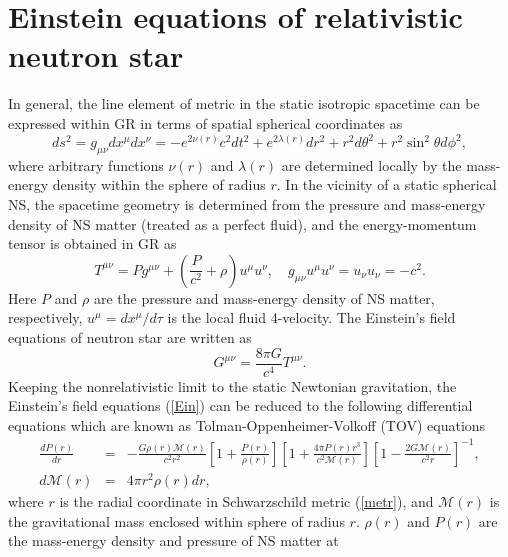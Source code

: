\section{Einstein equations of relativistic neutron star}%
\label{sec3.1}
In general, the line element of metric in the static isotropic spacetime can be 
expressed within GR  \citep{oppenheimer1939massive} in terms of spatial spherical 
coordinates as
\begin{equation}
        ds^2 = g_{\mu\nu}dx^\mu dx^\nu= - e^{2\nu(r)}c^2dt^2 + e^{2\lambda(r)}dr^2 + 
				r^2 d\theta^2 + r^2\sin^2\theta d\phi^2, \label{metr}
\end{equation}
where arbitrary functions $\nu(r)$ and $\lambda(r)$ are determined locally by the
mass-energy density within the sphere of radius $r$. In the vicinity of a 
static spherical NS, the spacetime geometry is determined from the pressure and 
mass-energy density of NS matter (treated as a perfect fluid), and the  
energy-momentum tensor is obtained in \gls{GR} as
\begin{equation}
        T^{\mu\nu}= Pg^{\mu\nu} + \left( \frac{P}{c^2} +\rho \right) u^\mu u^\nu,\quad
				g_{\mu\nu}u^\mu u^\nu=u_\nu u_\nu=-c^2.
\end{equation}
Here $P$ and $\rho$ are the pressure and mass-energy density of NS matter, respectively,
$u^\mu = dx^\mu/d\tau$ is the local fluid 4-velocity. The Einstein's field 
equations of neutron star are written as 
\begin{equation}
        G^{\mu\nu} = \frac{8\pi G}{c^4} T^{\mu\nu}. \label{Ein} 
\end{equation}
Keeping the nonrelativistic limit to the static Newtonian gravitation, the 
Einstein's field equations (\ref{Ein}) can be reduced to the following differential 
equations which are known as Tolman-Oppenheimer-Volkoff (\gls{TOV}) equations 
\citep{oppenheimer1939massive}
\begin{eqnarray}
\frac{d P(r)}{dr}&=& -\frac{G \rho(r)\mathcal{M}(r)}{c^2 r^2} 
 \left[ 1+\frac{P(r)}{\rho(r)}\right] 
\left[1+\frac{4 \pi P(r) r^3}{c^2 \mathcal{M}(r)} \right] 
\left[ 1-\frac{2G \mathcal{M}(r)}{c^2 r} \right]^{-1}, \nonumber \\
d\mathcal{M}(r) &=& 4\pi r^2 \rho(r)dr, \label{tov} 
\end{eqnarray}
where $r$ is the radial coordinate in Schwarzschild metric (\ref{metr}), and 
$\mathcal{M}(r)$ is the gravitational mass enclosed within sphere of radius $r$. 
$\rho(r)$ and $P(r)$ are the mass-energy density and pressure of NS matter at 
